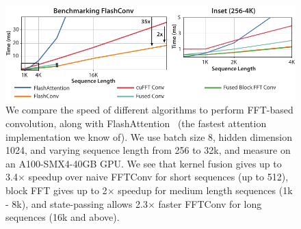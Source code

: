 \begin{figure}
    \centering
    \includegraphics[width=\textwidth]{figs/benchmark_pdf.pdf}
    \caption{\label{fig:fftconv_speed}
      We compare the speed of different algorithms to perform FFT-based
      convolution, along with FlashAttention~\citep{dao2022flashattention} (the fastest attention
      implementation we know of).
      We use batch size 8, hidden dimension 1024, and varying sequence length
      from 256 to 32k, and measure on an A100-SMX4-40GB GPU.
      We see that kernel fusion gives up to 3.4$\times$ speedup over naive FFTConv
      for short sequences (up to 512), block FFT gives up to 2$\times$ speedup for
      medium length sequences (1k - 8k), and state-passing allows 2.3$\times$ faster
      FFTConv for long sequences (16k and above).
    }
\end{figure}
